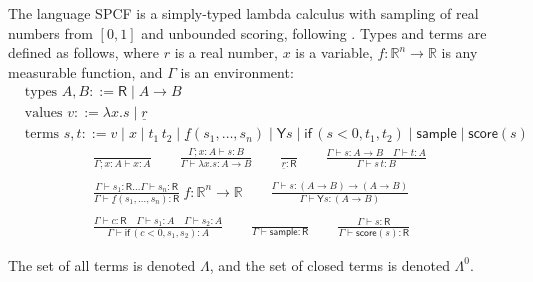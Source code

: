 \documentclass{article}
\newcommand{\tY}{\textsf{Y}}
\newcommand{\tif}[3]{\textsf{if}\,(#1, #2, #3)} %
\newcommand{\tsample}{\textsf{sample}}
\newcommand{\tscore}{\textsf{score}}
\theoremstyle{definition}
\theoremstyle{lemma}
\theoremstyle{remark}
\begin{document}
The language SPCF is a simply-typed lambda calculus with sampling of real numbers from $[0,1]$ and unbounded scoring, following \cite{MakOP20b}. Types and terms are defined as follows, where $r$ is a real number, $x$ is a variable, $f : \mathbb{R}^n \to \mathbb{R}$ is any measurable function, and $\Gamma$ is an environment:
\begin{align*}
  & \text{types } A, B ::= \textsf{R}  \mid  A \to B \\
  & \text{values } v ::= \lambda x.s  \mid  \underline{r} \\
  & \text{terms } s, t ::= v  \mid  x  \mid  t_1 \, t_2  \mid  \underline{f}(s_1,\dots ,s_n)  \mid  \tY s  \mid  \tif{s < 0}{t_1}{t_2}  \mid  \tsample  \mid  \tscore(s)
\end{align*}
\begin{align*}
  \frac{}{\Gamma ; x:A \vdash x:A} \qquad
  \frac{\Gamma ; x:A \vdash s : B}{\Gamma \vdash \lambda x.s : A \to B} \qquad
  \frac{}{\underline{r} : \textsf{R}} \qquad
  \frac{\Gamma \vdash s:A \to B \quad \Gamma \vdash t : A}{\Gamma \vdash s \, t : B} \\ \\
  \frac{\Gamma \vdash s_1:\textsf{R} \dots \Gamma \vdash s_n:\textsf{R}}{\Gamma \vdash \underline{f}(s_1,\dots,s_n) : \textsf{R}} \ f : \mathbb{R}^n \to \mathbb{R} \qquad
  \frac{\Gamma \vdash s : (A \to B) \to (A \to B)}{\Gamma \vdash \tY s : (A \to B)} \\ \\
  \frac{\Gamma \vdash c : \textsf{R} \quad \Gamma \vdash s_1 : A \quad \Gamma \vdash s_2 : A}{\Gamma \vdash \tif{c < 0}{s_1}{s_2} : A} \qquad
  \frac{}{\Gamma \vdash \tsample : \textsf{R}} \qquad
  \frac{\Gamma \vdash s : \textsf{R}}{\Gamma \vdash \tscore (s) : \textsf{R}}
\end{align*}

The set of all terms is denoted $\Lambda$, and the set of closed terms is denoted $\Lambda^0$.
\end{document}
